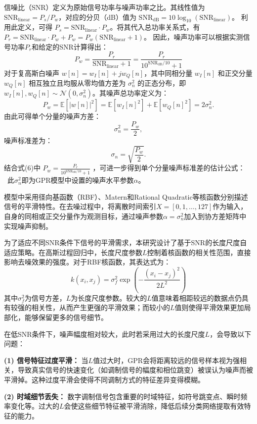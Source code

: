 \documentclass[conference]{IEEEtran}
\begin{document}
信噪比（SNR）定义为原始信号功率与噪声功率之比。其线性值为$\mathrm{SNR}_{\text{linear}} = P_s/P_w$，对应的分贝（dB）值为 $\mathrm{SNR}_{\text{dB}} = 10\log_{10}(\mathrm{SNR}_{\text{linear}})$。
利用此定义，可得 $P_s = \mathrm{SNR}_{\text{linear}} \cdot P_w$。将其代入总功率关系式，有 $P_r = \mathrm{SNR}_{\text{linear}} \cdot P_w + P_w = P_w(\mathrm{SNR}_{\text{linear}} + 1)$。
因此，噪声功率可以根据实测信号功率$P_r$和给定的SNR计算得出：
\begin{equation}
P_w = \frac{P_r}{\mathrm{SNR}_{\text{linear}} + 1} = \frac{P_r}{10^{\mathrm{SNR}_{\text{dB}}/10} + 1}
\end{equation}
对于复高斯白噪声 $w[n]=w_I[n]+jw_Q[n]$，其中同相分量 $w_I[n]$ 和正交分量 $w_Q[n]$ 相互独立且均服从零均值方差为 $\sigma_n^2$ 的正态分布，即 $w_I[n],w_Q[n]\sim\mathcal{N}(0,\sigma_n^2)$。其噪声总功率定义为：
\[
P_w=\mathbb{E}[|w[n]|^2]
=\mathbb{E}[w_I[n]^2]+\mathbb{E}[w_Q[n]^2]
=2\sigma_n^2.
\]
由此可得单个分量的噪声方差：
\[
\sigma_n^2=\frac{P_w}{2},
\]
噪声标准差为：
\[
\sigma_n=\sqrt{\frac{P_w}{2}}.
\]
结合式(6)中 $P_w=\frac{P_r}{10^{\mathrm{SNR}_{\mathrm{dB}}/10}+1}$ ，可进一步得到单个分量噪声标准差的估计公式：
\
此$\sigma_n^2$即为GPR模型中设置的噪声水平参数$\alpha$。

模型中采用径向基函数（RBF）、Matern和Rational Quadratic等核函数分别描述信号的平滑特性。在去噪过程中，将离散时间索引$X=[0,1,\ldots,127]$作为输入，自身的同相或正交分量作为观测目标，通过噪声参数$\alpha=\sigma_n^2$加入到协方差矩阵中实现噪声抑制。

为了适应不同SNR条件下信号的平滑需求，本研究设计了基于SNR的长度尺度自适应策略。在高斯过程回归中，长度尺度参数$L$控制着核函数的相关性范围，直接影响去噪效果的强度。对于RBF核函数，其表达式为：
\begin{equation}
k(x_i, x_j) = \sigma_f^2 \exp\left(-\frac{(x_i - x_j)^2}{2L^2}\right)
\end{equation}
其中$\sigma_f^2$为信号方差，$L$为长度尺度参数。较大的$L$值意味着相距较远的数据点仍具有较强的相关性，从而产生更强的平滑效果；而较小的$L$值则使得平滑效果更加局部化，能够保留更多的信号细节。

在低SNR条件下，噪声幅度相对较大，此时若采用过大的长度尺度$L$，会导致以下问题：

\textbf{(1) 信号特征过度平滑：} 当$L$值过大时，GPR会将距离较远的信号样本视为强相关，导致真实信号的快速变化（如调制信号的幅度和相位跳变）被误认为噪声而被平滑掉。这种过度平滑会使得不同调制方式的特征差异变得模糊。

\textbf{(2) 时域细节丢失：} 数字调制信号包含重要的时域特征，如符号跳变点、瞬时频率变化等。过大的$L$会使这些细节特征被平滑消除，降低后续分类网络提取有效特征的能力。
\end{document}

